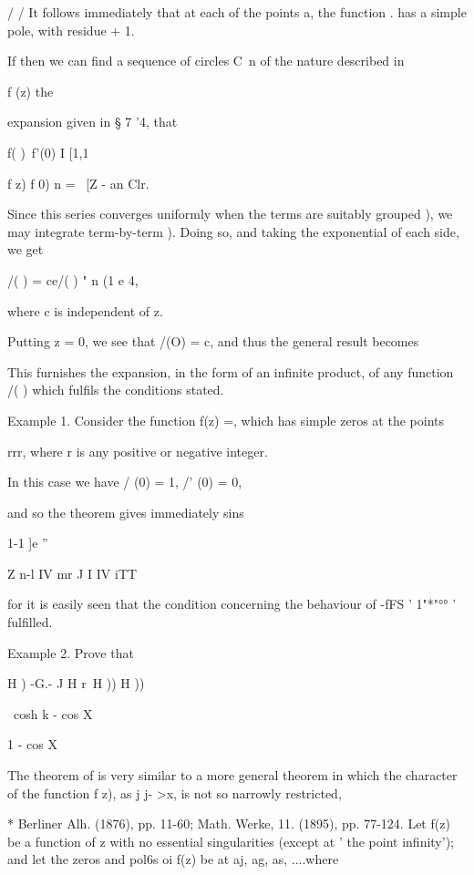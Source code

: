 / /
%
%
It follows immediately that at each of the points a, the function .
has a simple pole, with residue + 1.

If then we can find a sequence of circles C\ n of the nature described
in

f (z) %
the

expansion given in § 7 '4, that

f( )\ f'(0) I [1,1

f z) f 0) n = \ [Z - an Clr.

Since this series converges uniformly when the terms are suitably
grouped ), we may integrate term-by-term ). Doing so, and
taking the exponential of each side, we get

/( ) = ce/( ) " n (1 e 4,

where c is independent of z.

Putting z = 0, we see that /(O) = c, and thus the general result
becomes

This furnishes the expansion, in the form of an infinite product, of
any function /( ) which fulfils the conditions stated.

Example 1. Consider the function f(z) =, which has simple zeros at
the points

rrr, where r is any positive or negative integer.

In this case we have / (0) = 1, /' (0) = 0,

and so the theorem gives immediately sins

1-1 ]e ''

Z n-l IV mr J I IV iTT

for it is easily seen that the condition concerning the behaviour of
-fFS ' 1"*"°° ' fulfilled.

Example 2. Prove that

H ) -G.- J H r\ H )) H ))

\ cosh k - cos X

1 - cos X



The theorem of is very similar to a more general theorem in
which the character of the function f z), as j j- >x, is not so
narrowly restricted,

* Berliner Alh. (1876), pp. 11-60; Math. Werke, 11. (1895), pp.
77-124.
%
%
Let f(z) be a function of z with no essential singularities (except at
' the point infinity'); and let the zeros and pol6s oi f(z) be at aj,
ag, as, ....where


